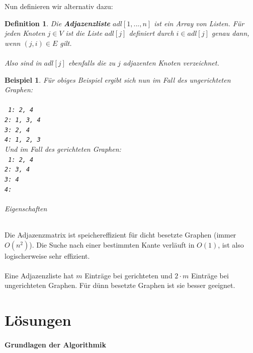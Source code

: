\documentclass[11pt,a4paper]{scrartcl}
\newtheorem{definition}{Definition}
\newtheorem{example}{Beispiel}
\begin{document}
Nun definieren wir alternativ dazu:
\begin{definition}
Die \textbf{Adjazenzliste} $adl[1, ..., n]$ ist ein Array von Listen. Für jeden Knoten $j \in V$ ist die Liste $adl[j]$ definiert durch $i \in adl[j]$ genau dann, wenn $(j, i) \in E$ gilt. \\\\
Also sind in $adl[j]$ ebenfalls die zu $j$ adjazenten Knoten verzeichnet.
\end{definition}
\begin{example}
Für obiges Beispiel ergibt sich nun im Fall des ungerichteten Graphen: \\\\
\texttt{
1: 2, 4 \\
2: 1, 3, 4 \\
3: 2, 4 \\
4: 1, 2, 3}
\\
Und im Fall des gerichteten Graphen: \\
\texttt{
1: 2, 4 \\
2: 3, 4 \\
3: 4 \\
4: }
\end{example}
\paragraph{Eigenschaften}
Die Adjazenzmatrix ist speichereffizient für dicht besetzte Graphen (immer $O(n^{2})$). Die Suche nach einer bestimmten Kante verläuft in $O(1)$, ist also logischerweise sehr effizient. \\\\
Eine Adjazenzliste hat $m$ Einträge bei gerichteten und $2 \cdot m$ Einträge bei ungerichteten Graphen. Für dünn besetzte Graphen ist sie besser geeignet.
\pagebreak
\part{Lösungen}
\subsection{Grundlagen der Algorithmik}
\end{document}
